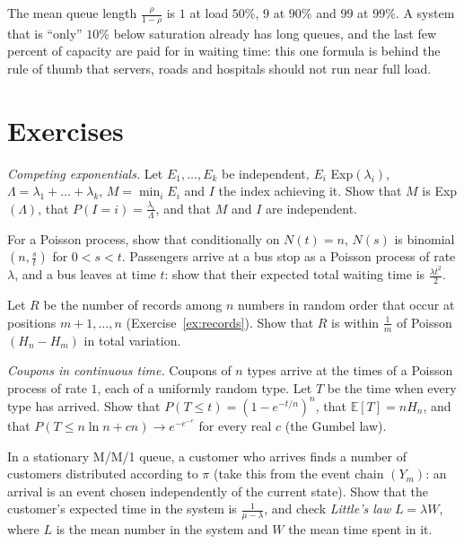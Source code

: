 \begin{beauty}
The mean queue length $\frac\rho{1-\rho}$ is $1$ at load $50\%$, $9$ at $90\%$ and $99$ at $99\%$. A system that is ``only'' $10\%$ below saturation already has
long queues, and the last few percent of capacity are paid for in waiting time: this one formula is behind the rule of
thumb that servers, roads and hospitals should not run near full load.
\end{beauty}

\section{Exercises}

\begin{exercise}[$\star$]\label{ex:race}
\emph{Competing exponentials.} Let $E_1,\dots,E_k$ be independent, $E_i$ Exp$(\lambda_i)$, $\Lambda=\lambda_1+\dots+\lambda_k$, $M=\min_iE_i$ and $I$ the index achieving it. Show that $M$ is
Exp$(\Lambda)$, that $P(I=i)=\frac{\lambda_i}\Lambda$, and that $M$ and $I$ are independent.
\end{exercise}

\begin{exercise}[$\star$]\label{ex:binomialsplit}
For a Poisson process, show that conditionally on $N(t)=n$, $N(s)$ is binomial$(n,\frac st)$ for $0<s<t$. Passengers arrive at a bus stop as a
Poisson process of rate $\lambda$, and a bus leaves at time $t$: show that their expected total waiting time is $\frac{\lambda t^2}2$.
\end{exercise}

\begin{exercise}[$\star\star$]\label{ex:records2}
Let $R$ be the number of records among $n$ numbers in random order that occur at positions $m+1,\dots,n$ (Exercise~\ref{ex:records}).
Show that $R$ is within $\frac1m$ of Poisson$(H_n-H_m)$ in total variation.
\end{exercise}

\begin{exercise}[$\star\star$]\label{ex:coupon2}
\emph{Coupons in continuous time.} Coupons of $n$ types arrive at the times of a Poisson process of rate $1$, each of a uniformly random
type. Let $T$ be the time when every type has arrived. Show that $P(T\le t)=(1-e^{-t/n})^n$, that $\mathbb E[T]=nH_n$, and that
$P(T\le n\ln n+cn)\to e^{-e^{-c}}$ for every real $c$ (the Gumbel law).
\end{exercise}

\begin{exercise}[$\star\star$]\label{ex:little}
In a stationary M/M/1 queue, a customer who arrives finds a number of customers distributed according to $\pi$ (take this
from the event chain $(Y_m)$: an arrival is an event chosen independently of the current state). Show that the customer's
expected time in the system is $\frac1{\mu-\lambda}$, and check \emph{Little's law} $L=\lambda W$, where $L$ is the mean number in the system and $W$ the mean
time spent in it.
\end{exercise}

